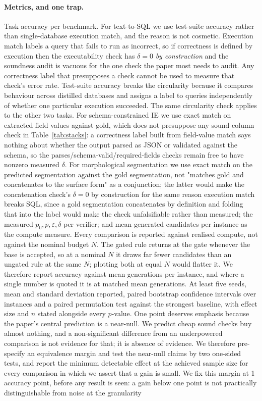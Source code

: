 \documentclass[11pt]{article}
\begin{document}
\paragraph{Metrics, and one trap.} Task accuracy per benchmark. For text-to-SQL we use test-suite accuracy \citep{zhong2020testsuite} rather than single-database execution match, and the reason is not cosmetic. Execution match labels a query that fails to run as incorrect, so if correctness is defined by execution then the executability check has $\delta=0$ \emph{by construction} and the soundness audit is vacuous for the one check the paper most needs to audit. Any correctness label that presupposes a check cannot be used to measure that check's error rate. Test-suite accuracy breaks the circularity because it compares behaviour across distilled databases and assigns a label to queries independently of whether one particular execution succeeded. The same circularity check applies to the other two tasks. For schema-constrained IE we use exact match on extracted field values against gold, which does not presuppose any sound-column check in Table~\ref{tab:stacks}: a correctness label built from field-value match says nothing about whether the output parsed as JSON or validated against the schema, so the parses/schema-valid/required-fields checks remain free to have nonzero measured $\delta$. For morphological segmentation we use exact match on the predicted segmentation against the gold segmentation, not "matches gold and concatenates to the surface form" as a conjunction; the latter would make the concatenation check's $\delta=0$ by construction for the same reason execution match breaks SQL, since a gold segmentation concatenates by definition and folding that into the label would make the check unfalsifiable rather than measured; the measured $p_0,p,\varepsilon,\delta$ per verifier; and mean generated candidates per instance as the compute measure. Every comparison is reported against realised compute, not against the nominal budget $N$. The gated rule returns at the gate whenever the base is accepted, so at a nominal $N$ it draws far fewer candidates than an ungated rule at the same $N$; plotting both at equal $N$ would flatter it. We therefore report accuracy against mean generations per instance, and where a single number is quoted it is at matched mean generations. At least five seeds, mean and standard deviation reported, paired bootstrap confidence intervals over instances \citep{efron1994bootstrap} and a paired permutation test against the strongest baseline, with effect size and $n$ stated alongside every $p$-value. One point deserves emphasis because the paper's central prediction is a near-null. We predict cheap sound checks buy almost nothing, and a non-significant difference from an underpowered comparison is not evidence for that; it is absence of evidence. We therefore pre-specify an equivalence margin and test the near-null claims by two one-sided tests, and report the minimum detectable effect at the achieved sample size for every comparison in which we assert that a gain is small. We fix this margin at 1 accuracy point, before any result is seen: a gain below one point is not practically distinguishable from noise at the granularity 
\end{document}
